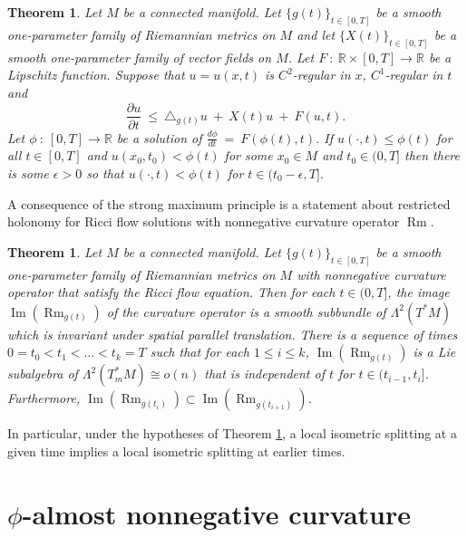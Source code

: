 \documentclass[12pt]{amsart}
\newcommand{\Image}{\operatorname{Im}}
\newcommand{\R}{{\mathbb R}}
\newcommand{\Rm}{\operatorname{Rm}}
\numberwithin{equation}{section}
\theoremstyle{plain}
\newtheorem{theorem}[equation]{Theorem}
\theoremstyle{definition}
\theoremstyle{remark}
\begin{document}
\begin{theorem}
Let $M$ be a connected manifold. Let $\{g(t)\}_{t \in [0,T]}$ be a smooth
one-parameter family of Riemannian metrics on $M$ and let 
$\{X(t)\}_{t \in [0, T]}$ be
a smooth one-parameter family of vector fields on $M$. Let $F \: : \:
\R \times [0, T] \rightarrow \R$ be a Lipschitz function.  Suppose that
$u=u(x,t)$ is $C^2$-regular in $x$, $C^1$-regular in $t$ and
\begin{equation}
\frac{\partial u}{\partial t} \: \le \: \triangle_{g(t)} u \: + \: X(t) u \: + \: F(u, t).
\end{equation}
Let $\phi \: : \: [0,T] \rightarrow \R$ be a solution of 
$\frac{d\phi}{dt} \: = \: F(\phi(t), t)$. If
$u(\cdot, t) \le \phi(t)$ for all $t \in [0, T]$ and
$u(x_0, t_0) < \phi(t)$ for some $x_0 \in M$ and $t_0 \in (0,T]$ then
there is some $\epsilon > 0$ so that $u(\cdot, t) < \phi(t)$ for
$t \in (t_0 - \epsilon, T]$.
\end{theorem}

A consequence of the strong maximum principle is a statement about
restricted holonomy for Ricci flow solutions with nonnegative curvature
operator $\Rm$.

\begin{theorem} \label{splitting}
Let $M$ be a connected manifold. Let $\{g(t)\}_{t \in [0,T]}$ be a smooth
one-parameter family of Riemannian metrics on $M$ with nonnegative
curvature operator that satisfy the Ricci flow equation.  Then for each $t \in (0, T]$, the
image $\Image(\Rm_{g(t)})$ of the curvature operator
is a smooth subbundle of $\Lambda^2(T^* M)$ which is invariant under
spatial parallel translation. There is a sequence of times
$0 = t_0 < t_1 < \ldots < t_k = T$ such that for each
$1 \le i \le k$,
$\Image(\Rm_{g(t)})$ is a Lie subalgebra of $\Lambda^2(T^*_m M)
\cong o(n)$ that is independent of $t$ for $t \in (t_{i-1}, t_i]$.
Furthermore, $\Image(\Rm_{g(t_i)}) \subset \Image(\Rm_{g(t_{i+1})})$.
\end{theorem}

In particular, under the hypotheses of Theorem \ref{splitting}, a
local isometric splitting at a given time implies a local
isometric splitting at earlier times.


\section{$\phi$-almost nonnegative curvature}
\label{phiappendix}
\end{document}
